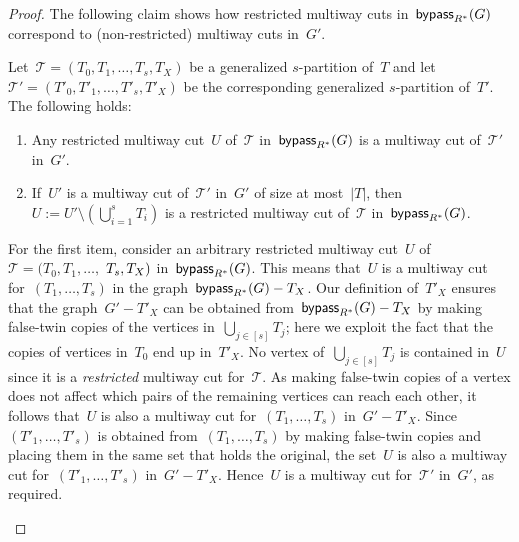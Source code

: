 \begin{proof}
The following claim shows how restricted multiway cuts in~$\mathsf{bypass}_{R^*}(G)$ correspond to (non-restricted) multiway cuts in~$G'$.
\begin{claim} \label{claim:multiway:restricted}
Let~$\mathcal{T} = (T_0, T_1, \ldots, T_s, T_X)$ be a generalized $s$-partition of~$T$ and let~$\mathcal{T}' = (T'_0, T'_1, \ldots, T'_s, T'_X)$ be the corresponding generalized $s$-partition of~$T'$. The following holds:
\begin{enumerate}
	\item Any restricted multiway cut~$U$ of~$\mathcal{T}$ in~$\mathsf{bypass}_{R^*}(G)$ is a multiway cut of~$\mathcal{T}'$ in~$G'$.
	\item If~$U'$ is a multiway cut of~$\mathcal{T}'$ in~$G'$ of size at most~$|T|$, then~$U := U' \setminus (\bigcup _{i=1}^s T_i)$ is a restricted multiway cut of~$\mathcal{T}$ in~$\mathsf{bypass}_{R^*}(G)$.
\end{enumerate}
\end{claim}
\begin{claimproof}
For the first item, consider an arbitrary restricted multiway cut~$U$ of~$\mathcal{T} = (T_0, T_1, \ldots,$ $ T_s, \linebreak[0] T_X)$ in~$\mathsf{bypass}_{R^*}(G)$. This means that~$U$ is a multiway cut for~$(T_1, \ldots, T_s)$ in the graph~$\mathsf{bypass}_{R^*}(G) - T_X$. Our definition of~$T'_X$ ensures that the graph~$G' - T'_X$ can be obtained from~$\mathsf{bypass}_{R^*}(G) - T_X$ by making false-twin copies of the vertices in~$\bigcup _{j \in [s]} T_j$; here we exploit the fact that the copies of vertices in~$T_0$ end up in~$T'_X$. No vertex of~$\bigcup _{j \in [s]} T_j$ is contained in~$U$ since it is a \emph{restricted} multiway cut for~$\mathcal{T}$. As making false-twin copies of a vertex does not affect which pairs of the remaining vertices can reach each other, it follows that~$U$ is also a multiway cut for~$(T_1, \ldots, T_s)$ in~$G' - T'_X$. Since~$(T'_1, \ldots, T'_s)$ is obtained from~$(T_1, \ldots, T_s)$ by making false-twin copies and placing them in the same set that holds the original, the set~$U$ is also a multiway cut for~$(T'_1, \ldots, T'_s)$ in~$G' - T'_X$. Hence~$U$ is a multiway cut for~$\mathcal{T}'$ in~$G'$, as required.


\end{claimproof}
\end{proof}
